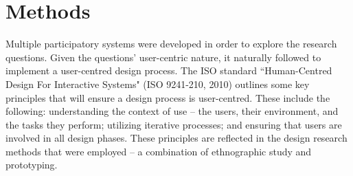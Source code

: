 


\section{Methods}

Multiple participatory systems were developed in order to explore the research questions. Given the questions' user-centric nature, it naturally followed to implement a user-centred design process. The ISO standard ``Human-Centred Design For Interactive Systems" (ISO 9241-210, 2010) outlines some key principles that will ensure a design process is user-centred. These include the following: understanding the context of use -- the users, their environment, and the tasks they perform; utilizing iterative processes; and ensuring that users are involved in all design phases. These principles are reflected in the design research methods that were employed -- a combination of ethnographic study and prototyping.

